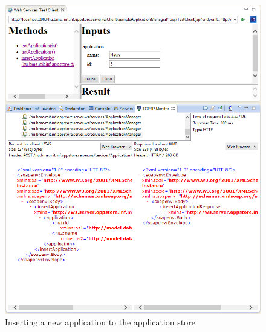 \documentclass[]{report}
\let\Oldincludegraphics\includegraphics
\renewcommand{\includegraphics}[1]{
\begin{adjustbox}{max size={\textwidth}{\textheight}}
    \Oldincludegraphics[scale=0.6]{#1}%
\end{adjustbox}
}
\begin{document}
\begin{enumerate}
  \begin{figure}[htbp]
  \centering
  \includegraphics{img/web_services/tcp_ip_monitor_insert.png}
  \caption{Inserting a new application to the application store}
  \end{figure}


\end{enumerate}
\end{document}
